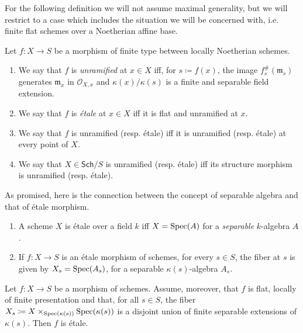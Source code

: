 \noindent
For the following definition we will not assume maximal generality, but
we will restrict to a case which includes the situation we will be concerned with,
i.e$.$ finite flat schemes over a Noetherian affine base.
\begin{defn}\label{defn:EtaleMorphismSheaves}
	Let $f\colon X \to S$ be a morphism of finite type between
	locally Noetherian schemes.
\begin{enumerate}
	\item We say that $f$ is \emph{unramified} at $x \in X$ iff, for $s \coloneqq f(x)$,
		the image $f^{\#}_s(\mathfrak{m}_s)$ generates
		$\mathfrak{m}_x$ in $\mathcal{O}_{ X,x }$
		and $\kappa(x)/\kappa(s)$ is a finite and separable field extension.

	\item We say that $f$ is \emph{étale} at $x \in X$ iff it is
		flat and unramified at $x$.

	\item We say that $f$ is unramified (resp$.$ étale) iff it is 
		unramified (resp$.$ étale) at every point of $X$.

	\item We say that $X \in \mathsf{Sch}/S$ is unramified 
		(resp$.$ étale) iff its structure
		morphism is unramified (resp$.$ étale).
\end{enumerate}
\end{defn}


\noindent
As promised, here is the connection between the concept of separable algebra and
that of étale morphism.
\begin{lem}
	\label{lem:EtaleMorphismsSchemes}
	\leavevmode\vspace{-.2\baselineskip}
\begin{enumerate}
	\item A scheme $X$ is étale over a field $k$ iff $X = \operatorname{Spec}(A)$
		for a \emph{separable} $k$-algebra $A$.
	\item If $f\colon X \to S$ is an étale morphism of schemes,
		for every $s \in S$, the fiber at $s$ is given by $X_s = \operatorname{Spec}(A_s)$,
		for a separable $\kappa(s)$-algebra $A_s$.
\end{enumerate}
\end{lem} 


\begin{lem}
	\label{FlatMorphismEtaleViaFibers}
	Let $f\colon X \to S$ be a morphism of schemes.
	Assume, moreover, that $f$ is flat, locally of finite presentation and that,
	for all $s \in S$, the fiber $X_s \coloneqq 
	X \times_{\operatorname{Spec}(\kappa(s))} \operatorname{Spec}(\kappa(s))$
	is a disjoint union of finite separable extensions of $\kappa(s)$.
	Then $f$ is étale.
\end{lem} 


